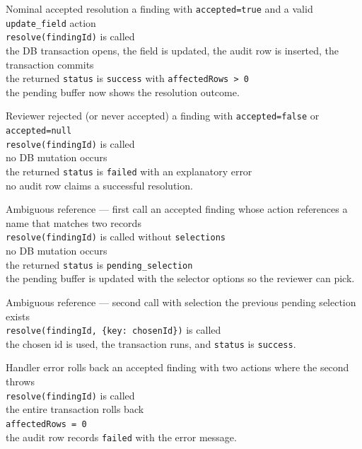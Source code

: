 \begin{scenario}{Nominal accepted resolution}
\Given a finding with \texttt{accepted=true} and a valid \texttt{update\_field} action \\
\When \texttt{resolve(findingId)} is called \\
\Then the DB transaction opens, the field is updated, the audit row is inserted, the transaction commits \\
\And the returned \texttt{status} is \texttt{success} with \texttt{affectedRows > 0} \\
\And the pending buffer now shows the resolution outcome.
\end{scenario}

\begin{scenario}{Reviewer rejected (or never accepted)}
\Given a finding with \texttt{accepted=false} or \texttt{accepted=null} \\
\When \texttt{resolve(findingId)} is called \\
\Then no DB mutation occurs \\
\And the returned \texttt{status} is \texttt{failed} with an explanatory error \\
\And no audit row claims a successful resolution.
\end{scenario}

\begin{scenario}{Ambiguous reference --- first call}
\Given an accepted finding whose action references a name that matches two records \\
\When \texttt{resolve(findingId)} is called without \texttt{selections} \\
\Then no DB mutation occurs \\
\And the returned \texttt{status} is \texttt{pending\_selection} \\
\And the pending buffer is updated with the selector options so the reviewer can pick.
\end{scenario}

\begin{scenario}{Ambiguous reference --- second call with selection}
\Given the previous pending selection exists \\
\When \texttt{resolve(findingId, \{key: chosenId\})} is called \\
\Then the chosen id is used, the transaction runs, and \texttt{status} is \texttt{success}.
\end{scenario}

\begin{scenario}{Handler error rolls back}
\Given an accepted finding with two actions where the second throws \\
\When \texttt{resolve(findingId)} is called \\
\Then the entire transaction rolls back \\
\And \texttt{affectedRows = 0} \\
\And the audit row records \texttt{failed} with the error message.
\end{scenario}

